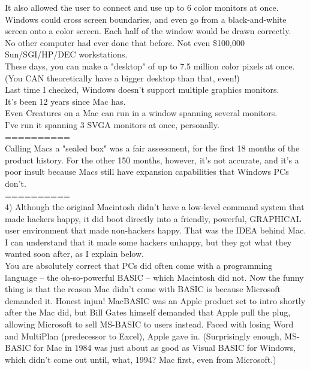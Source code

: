 \documentclass[11pt,twoside,a4paper]{article}
\begin{document}
\begin{multicols*}{2}
It also allowed the user to connect and use up to 6 color monitors at once. Windows could cross screen boundaries, and even go from a black-and-white screen onto a color screen. Each half of the window would be drawn correctly.~\\

No other computer had ever done that before. Not even \$100,000 Sun/SGI/HP/DEC workstations.~\\

These days, you can make a "desktop" of up to 7.5 million color pixels at once. (You CAN theoretically have a bigger desktop than that, even!)~\\

Last time I checked, Windows doesn't support multiple graphics monitors.~\\
It's been 12 years since Mac has.~\\

Even Creatures on a Mac can run in a window spanning several monitors.~\\
I've run it spanning 3 SVGA monitors at once, personally.~\\

==========~\\
Calling Macs a "sealed box" was a fair assessment, for the first 18 months of the product history. For the other 150 months, however, it's not accurate, and it's a poor insult because Macs still have expansion capabilities that Windows PCs don't.~\\
==========~\\

4) Although the original Macintosh didn't have a low-level command system that made hackers happy, it did boot directly into a friendly, powerful, GRAPHICAL user environment that made non-hackers happy. That was the IDEA behind Mac. I can understand that it made some hackers unhappy, but they got what they wanted soon after, as I explain below.~\\

You are absolutely correct that PCs did often come with a programming language -- the oh-so-powerful BASIC -- which Macintosh did not. Now the funny thing is that the reason Mac didn't come with BASIC is because Microsoft demanded it. Honest injun! MacBASIC was an Apple product set to intro shortly after the Mac did, but Bill Gates himself demanded that Apple pull the plug, allowing Microsoft to sell MS-BASIC to users instead. Faced with losing Word and MultiPlan (predecessor to Excel), Apple gave in. (Surprisingly enough, MS-BASIC for Mac in 1984 was just about as good as Visual BASIC for Windows, which didn't come out until, what, 1994? Mac first, even from Microsoft.)~\\


\end{multicols*}
\end{document}
